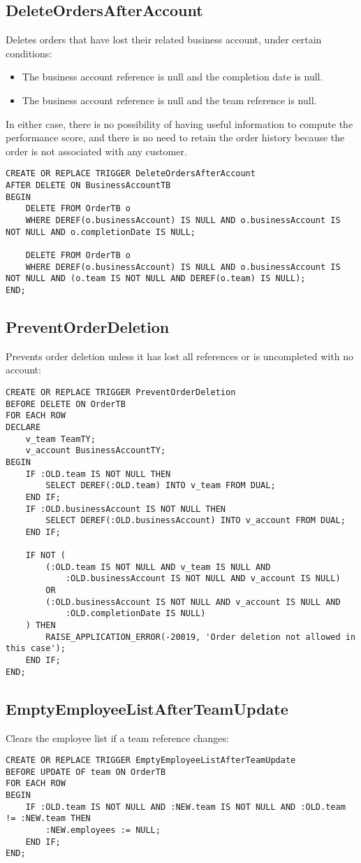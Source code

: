 \subsection*{DeleteOrdersAfterAccount}
Deletes orders that have lost their related business account, under certain conditions:
\begin{itemize}[label=-]
    \item The business account reference is null and the completion date is null.
    \item The business account reference is null and the team reference is null.
\end{itemize}
In either case, there is no possibility of having useful information to compute the performance score, and there is no need to retain the order history because the order is not associated with any customer.
\begin{lstlisting}
CREATE OR REPLACE TRIGGER DeleteOrdersAfterAccount
AFTER DELETE ON BusinessAccountTB
BEGIN
    DELETE FROM OrderTB o
    WHERE DEREF(o.businessAccount) IS NULL AND o.businessAccount IS NOT NULL AND o.completionDate IS NULL;

    DELETE FROM OrderTB o
    WHERE DEREF(o.businessAccount) IS NULL AND o.businessAccount IS NOT NULL AND (o.team IS NOT NULL AND DEREF(o.team) IS NULL);
END;
\end{lstlisting}

\subsection*{PreventOrderDeletion}
Prevents order deletion unless it has lost all references or is uncompleted with no account:
\begin{lstlisting}
CREATE OR REPLACE TRIGGER PreventOrderDeletion
BEFORE DELETE ON OrderTB
FOR EACH ROW
DECLARE
    v_team TeamTY;
    v_account BusinessAccountTY;
BEGIN
    IF :OLD.team IS NOT NULL THEN
        SELECT DEREF(:OLD.team) INTO v_team FROM DUAL;
    END IF;
    IF :OLD.businessAccount IS NOT NULL THEN
        SELECT DEREF(:OLD.businessAccount) INTO v_account FROM DUAL;
    END IF;

    IF NOT (
        (:OLD.team IS NOT NULL AND v_team IS NULL AND 
            :OLD.businessAccount IS NOT NULL AND v_account IS NULL)
        OR
        (:OLD.businessAccount IS NOT NULL AND v_account IS NULL AND 
            :OLD.completionDate IS NULL)
    ) THEN
        RAISE_APPLICATION_ERROR(-20019, 'Order deletion not allowed in this case');
    END IF;
END;
\end{lstlisting}

\subsection*{EmptyEmployeeListAfterTeamUpdate}
Clears the employee list if a team reference changes:
\begin{lstlisting}
CREATE OR REPLACE TRIGGER EmptyEmployeeListAfterTeamUpdate
BEFORE UPDATE OF team ON OrderTB
FOR EACH ROW
BEGIN
    IF :OLD.team IS NOT NULL AND :NEW.team IS NOT NULL AND :OLD.team != :NEW.team THEN
        :NEW.employees := NULL;
    END IF;
END;
\end{lstlisting}
